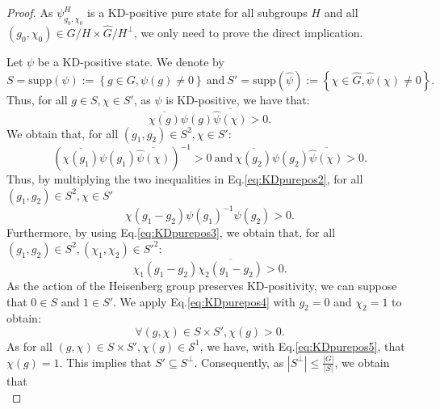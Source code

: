 \documentclass[a4paper, notitlepage, 11pt]{article}
\numberwithin{equation}{section}
\newcommand{\mcl}[1]{\ensuremath{\mathcal{#1}}}
\begin{document}
\begin{proof}
    As $\psi^{H}_{g_0,\chi_0}$ is a KD-positive pure state for all subgroups $H$ and all $(g_0,\chi_0)\in G/H \times\hat{G}/H^{\perp}$, we only need to prove the direct implication. 
    
    Let $\psi$ be a KD-positive state. We denote by 
    \begin{equation}
        S=\mathrm{supp}(\psi):= \left\{g\in G, \psi(g) \neq 0\right\} \mathrm{\ and \ } S' = \mathrm{supp}(\hat{\psi}):= \left\{\chi\in \hat{G}, \hat{\psi}(\chi) \neq 0\right\}.
    \end{equation}
    Thus, for all $g\in S, \chi \in S'$, as $\psi$ is KD-positive, we have that:
    \begin{equation}\label{eq:KDpurepos1}
        \overline{\chi(g)}\psi(g)\overline{\hat{\psi}(\chi)} >0.
    \end{equation}
    We obtain that, for all $(g_1,g_2)\in S^2, \chi \in S'$:
    \begin{equation}\label{eq:KDpurepos2}
        \left(\overline{\chi(g_1)}\psi(g_1)\overline{\hat{\psi}(\chi)}\right)^{-1} >0 \mathrm{ \ and \ } \overline{\chi(g_2)}\psi(g_2)\overline{\hat{\psi}(\chi)} > 0.
    \end{equation}
    Thus, by multiplying the two inequalities in Eq.\eqref{eq:KDpurepos2}, for all $(g_1,g_2)\in S^2, \chi \in S'$
    \begin{equation}\label{eq:KDpurepos3}
        \chi(g_1-g_2)\psi(g_1)^{-1}\psi(g_2) > 0.
    \end{equation}
    Furthermore, by using Eq.\eqref{eq:KDpurepos3}, we obtain that, for all $(g_1,g_2)\in S^2, (\chi_1,\chi_2) \in S'^{2}$:
    \begin{equation}\label{eq:KDpurepos4}
        \chi_{1}(g_1-g_2)\overline{\chi_{2}(g_1-g_2)} > 0.
    \end{equation}
    As the action of the Heisenberg group preserves KD-positivity, we can suppose that $0\in S$ and $1\in S'$. We apply Eq.\eqref{eq:KDpurepos4} with $g_2=0$ and $\chi_2=1$ to obtain:
    \begin{equation}\label{eq:KDpurepos5}
        \forall (g,\chi) \in S\times S', \chi(g) > 0.
    \end{equation}
    As for all $(g,\chi) \in S\times S', \chi(g)\in\mcl{S}^{1}$, we have, with Eq.\eqref{eq:KDpurepos5}, that $ \chi(g)=1$. This implies that $S'\subseteq S^{\perp}$. Consequently, as $\left|S^{\perp}\right| \leqslant  \frac{\left|G\right|}{\left|S\right|}$, we obtain that 
    \begin{equation}\label{eq:KDpurepos6}

\end{equation}
\end{proof}
\end{document}

